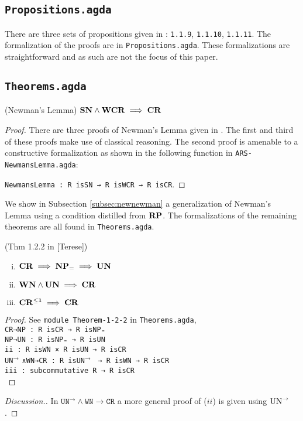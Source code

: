 \subsection{\texttt{Propositions.agda}}
There are three sets of propositions given in \terese: \texttt{1.1.9}, \texttt{1.1.10}, \texttt{1.1.11}.
The formalization of the proofs are in \texttt{Propositions.agda}. These formalizations are straightforward
and as such are not the focus of this paper.

\subsection{\texttt{Theorems.agda}} \label{subsec:theorems}

\begin{theorem}(Newman's Lemma)
  $\mathbf{SN} \land \mathbf{WCR} \implies \mathbf{CR}$
\end{theorem}

\begin{proof}
  There are three proofs of Newman's Lemma given in \terese.
  The first and third of these proofs make use of classical reasoning. The second proof is amenable to a
  constructive formalization as shown in the following function in \texttt{ARS-NewmansLemma.agda}:

  \verb|NewmansLemma : R isSN → R isWCR → R isCR|.
\end{proof}

  We show in Subsection \ref{subsec:newnewman} a generalization of Newman's Lemma using a condition distilled from $\mathbf{RP}$.
  The formalizations of the remaining theorems are all found in \texttt{Theorems.agda}.

\begin{theorem}(Thm 1.2.2 in [Terese])
\begin{enumerate}[(i)]
  \item $\mathbf{CR} \implies \mathbf{NP_=} \implies \mathbf{UN}$
  \item $\mathbf{WN} \land \mathbf{UN} \implies \mathbf{CR}$
  \item $\mathbf{CR^{\le 1}} \implies \mathbf{CR}$
\end{enumerate}
\end{theorem}

\begin{proof}
    See \texttt{module Theorem-1-2-2} in \texttt{Theorems.agda}, \\
    \verb|CR→NP : R isCR → R isNP₌|\\
    \verb|NP→UN : R isNP₌ → R isUN|\\
    \verb|ii : R isWN × R isUN → R isCR|\\
    \verb||\texttt{UN}$^{\to}$ \verb|∧WN→CR : R |\texttt{isUN}$^{\to}$ \verb| → R isWN → R isCR|\\
    \verb|iii : subcommutative R → R isCR|\\
\end{proof}
\begin{proof}[Discussion.]
    In $\mathtt{UN^{→}∧WN→CR}$ a more general proof of ($ii$) is given using $\mathrm{UN}^{\to}$.
\end{proof}

